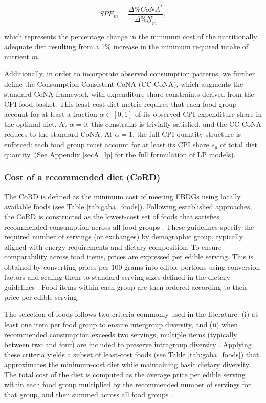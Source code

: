 \documentclass[Afour, sageh,times]{sagej}
\begin{document}
\begin{equation}
SPE_{m} = \frac{\Delta \% CoNA^{*}}{\Delta \% \underline{N}_{m}},
\end{equation}

which represents the percentage change in the minimum cost of the nutritionally adequate diet resulting from a 1\% increase in the minimum required intake of nutrient $m$.

Additionally, in order to incorporate observed consumption patterns, we further define the Consumption-Consistent CoNA (CC-CoNA), which augments the standard CoNA framework with expenditure-share constraints derived from the CPI food basket. This least-cost diet metric requires that each food group account for at least a fraction $\alpha \in [0, 1]$ of its observed CPI expenditure share in the optimal diet. At $\alpha = 0$, this constraint is trivially satisfied, and the CC-CoNA reduces to the standard CoNA. At $\alpha = 1$, the full CPI quantity structure is enforced: each food group must account for at least its CPI share $s_g$ of total diet quantity. (See Appendix \ref{secA_lp} for the full formulation of LP models). 

\subsubsection{Cost of a recommended diet (CoRD)}

The CoRD is defined as the minimum cost of meeting FBDGs using locally available foods (see Table \ref{tab:gaba_foods}). Following established approaches, the CoRD is constructed as the lowest-cost set of foods that satisfies recommended consumption across all food groups \citep{Dizon2019, Herforth2020}. These guidelines specify the required number of servings (or exchanges) by demographic group, typically aligned with energy requirements and dietary composition. To ensure comparability across food items, prices are expressed per edible serving. This is obtained by converting prices per 100 grams into edible portions using conversion factors and scaling them to standard serving sizes defined in the dietary guidelines \citep{Herforth2022}. Food items within each group are then ordered according to their price per edible serving.

The selection of foods follows two criteria commonly used in the literature: (i) at least one item per food group to ensure intergroup diversity, and (ii) when recommended consumption exceeds two servings, multiple items (typically between two and four) are included to preserve intragroup diversity \citep{Dizon2019, Herforth2020}. Applying these criteria yields a subset of least-cost foods (see Table \ref{tab:gaba_foods}) that approximates the minimum-cost diet while maintaining basic dietary diversity. The total cost of the diet is computed as the average price per edible serving within each food group multiplied by the recommended number of servings for that group, and then summed across all food groups \citep{Herforth2022}.
\end{document}
